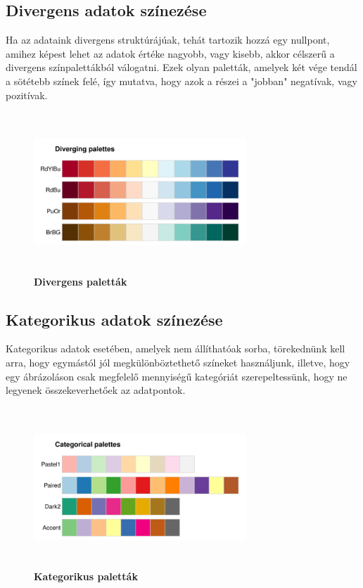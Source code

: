 \documentclass[12pt]{article}
\theoremstyle{plain}
\begin{document}
 \subsection{Divergens adatok színezése}
 Ha az adataink divergens struktúrájúak, tehát tartozik hozzá egy nullpont, amihez képest lehet az adatok értéke nagyobb, vagy kisebb, akkor célszerű a divergens színpalettákból válogatni. Ezek olyan paletták, amelyek két vége tendál a sötétebb színek felé, így mutatva, hogy azok a részei a "jobban" negatívak, vagy pozitívak.
 
  \begin{figure}[H]
    \centering
    \includegraphics[width=8cm, height=6cm]{media/diverging.png}
    \caption{\textbf{Divergens paletták}}
    \label{fig:GeneralDiagram}
 \end{figure}
 
 \subsection{Kategorikus adatok színezése}
 Kategorikus adatok esetében, amelyek nem állíthatóak sorba, törekednünk kell arra, hogy egymástól jól megkülönböztethető színeket használjunk, illetve, hogy egy ábrázoláson csak megfelelő mennyiségű kategóriát szerepeltessünk, hogy ne legyenek összekeverhetőek az adatpontok.
 
 
 
 \begin{figure}[H]
    \centering
    \includegraphics[width=8cm, height=6cm]{media/categorical.png}
    \caption{\textbf{Kategorikus paletták}}
    \label{fig:GeneralDiagram}
 \end{figure}
 
\end{document}
